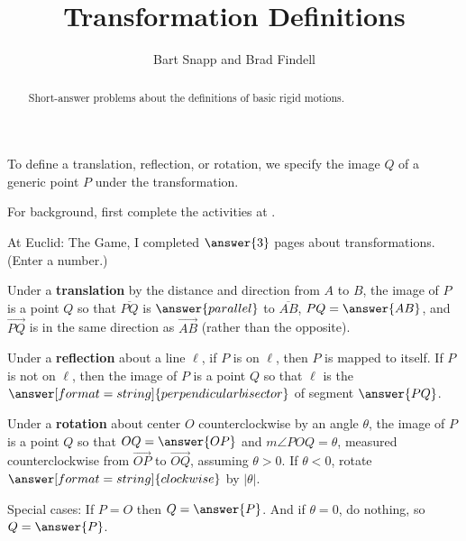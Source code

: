 \documentclass[nooutcomes]{ximera}
\title{Transformation Definitions}
\author{Bart Snapp and Brad Findell}
\begin{document}
\begin{abstract}
Short-answer problems about the definitions of basic rigid motions.
\end{abstract}
\maketitle

To define a translation, reflection, or rotation, we specify the image $Q$ of a generic point $P$ under the transformation.  

For background, first complete the activities at .

\begin{question}
At Euclid: The Game, I  completed $\answer{3}$ pages about transformations. (Enter a number.)
\end{question}

\begin{question}
Under a \textbf{translation} by the distance and direction from $A$ to $B$, the image of $P$ is a point $Q$ so that $\overline{PQ}$ is $\answer{parallel}$ to $\overline{AB}$, $PQ=\answer{AB}$, and $\overrightarrow{PQ}$ is in the same direction as $\overrightarrow{AB}$ (rather than the opposite).  
\end{question}

\begin{question}
Under a \textbf{reflection} about a line $\ell$, if $P$ is on $\ell$, then $P$ is mapped to itself.  If $P$ is not on $\ell$, then the image of $P$ is a point $Q$ so that $\ell$ is the 
$\answer[format=string]{perpendicular bisector}$ of segment $\answer{PQ}$.  
\end{question}

\begin{question}
Under a \textbf{rotation} about center $O$ counterclockwise by an angle $\theta$, the image of $P$ is 
a point $Q$ so that $OQ = \answer{OP}$ and $m\angle POQ = \theta$, measured counterclockwise 
from $\overrightarrow{OP}$ to $\overrightarrow{OQ}$, assuming $\theta>0$.  If $\theta<0$, rotate $\answer[format=string]{clockwise}$ by $|\theta|$.  

Special cases:  If $P = O$ then $Q=\answer{P}$.  And if $\theta=0$, do nothing, so $Q=\answer{P}$. 
\end{question}

\end{document}

